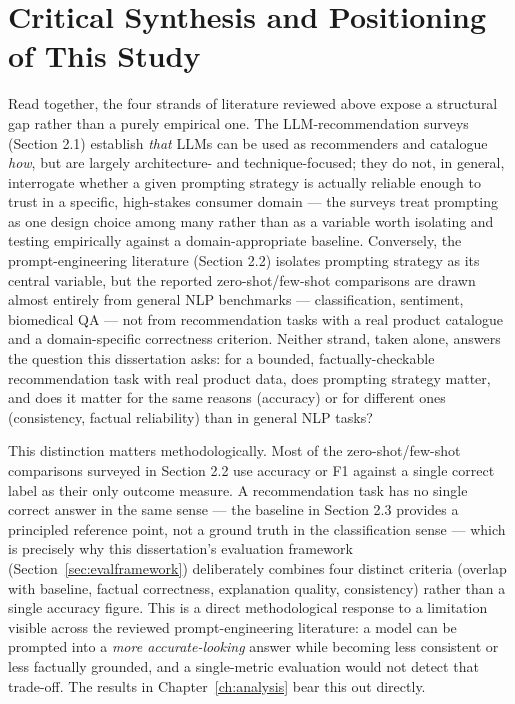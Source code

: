 \section{Critical Synthesis and Positioning of This Study}

Read together, the four strands of literature reviewed above expose a structural gap rather than a purely empirical one. The LLM-recommendation surveys (Section 2.1) establish \textit{that} LLMs can be used as recommenders and catalogue \textit{how}, but are largely architecture- and technique-focused; they do not, in general, interrogate whether a given prompting strategy is actually reliable enough to trust in a specific, high-stakes consumer domain --- the surveys treat prompting as one design choice among many rather than as a variable worth isolating and testing empirically against a domain-appropriate baseline. Conversely, the prompt-engineering literature (Section 2.2) isolates prompting strategy as its central variable, but the reported zero-shot/few-shot comparisons are drawn almost entirely from general NLP benchmarks --- classification, sentiment, biomedical QA --- not from recommendation tasks with a real product catalogue and a domain-specific correctness criterion. Neither strand, taken alone, answers the question this dissertation asks: for a bounded, factually-checkable recommendation task with real product data, does prompting strategy matter, and does it matter for the same reasons (accuracy) or for different ones (consistency, factual reliability) than in general NLP tasks?

This distinction matters methodologically. Most of the zero-shot/few-shot comparisons surveyed in Section 2.2 use accuracy or F1 against a single correct label as their only outcome measure. A recommendation task has no single correct answer in the same sense --- the baseline in Section 2.3 provides a principled reference point, not a ground truth in the classification sense --- which is precisely why this dissertation's evaluation framework (Section~\ref{sec:evalframework}) deliberately combines four distinct criteria (overlap with baseline, factual correctness, explanation quality, consistency) rather than a single accuracy figure. This is a direct methodological response to a limitation visible across the reviewed prompt-engineering literature: a model can be prompted into a \textit{more accurate-looking} answer while becoming less consistent or less factually grounded, and a single-metric evaluation would not detect that trade-off. The results in Chapter~\ref{ch:analysis} bear this out directly.

